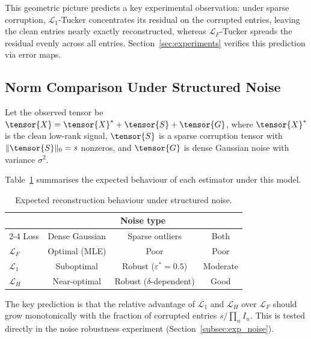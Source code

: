 \noindent
This geometric picture predicts a key experimental observation: under
sparse corruption, $\mathcal{L}_1$-Tucker concentrates its residual
on the corrupted entries, leaving the clean entries nearly exactly
reconstructed, whereas $\mathcal{L}_F$-Tucker spreads the residual
evenly across all entries.
Section~\ref{sec:experiments} verifies this prediction via error maps.

\subsection{Norm Comparison Under Structured Noise}
\label{subsec:norm_comparison}

Let the observed tensor be
$\tensor{X} = \tensor{X}^* + \tensor{S} + \tensor{G}$,
where $\tensor{X}^*$ is the clean low-rank signal,
$\tensor{S}$ is a sparse corruption tensor with
$\|\tensor{S}\|_0 = s$ nonzeros,
and $\tensor{G}$ is dense Gaussian noise with variance $\sigma^2$.

Table~\ref{tab:norm_noise} summarises the expected behaviour of each
estimator under this model.

\begin{table}[h]
  \centering
  \caption{Expected reconstruction behaviour under structured noise.}
  \label{tab:norm_noise}
  \begin{tabular}{lccc}
    \toprule
    & \multicolumn{3}{c}{Noise type} \\
    \cmidrule(lr){2-4}
    Loss & Dense Gaussian & Sparse outliers & Both \\
    \midrule
    $\mathcal{L}_F$ & Optimal (MLE) & Poor & Poor \\
    $\mathcal{L}_1$ & Suboptimal    & Robust ($\varepsilon^*{=}0.5$) & Moderate \\
    $\mathcal{L}_H$ & Near-optimal  & Robust ($\delta$-dependent) & Good \\
    \bottomrule
  \end{tabular}
\end{table}

\noindent
The key prediction is that the relative advantage of
$\mathcal{L}_1$ and $\mathcal{L}_H$ over $\mathcal{L}_F$ should grow
monotonically with the fraction of corrupted entries $s / \prod_n I_n$.
This is tested directly in the noise robustness experiment
(Section~\ref{subsec:exp_noise}).


